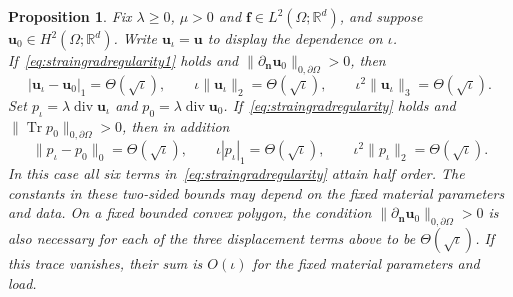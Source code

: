 \documentclass[10pt]{amsart}
\newtheorem{proposition}[theorem]{Proposition}
\renewcommand{\div}{\operatorname{div}}
\numberwithin{equation}{section}
\begin{document}
\begin{proposition}\label{prop:boundary-mismatch}
Fix $\lambda\geq0$, $\mu>0$ and $\boldsymbol f\in L^2(\Omega;\mathbb R^d)$, and suppose $\boldsymbol u_0\in H^2(\Omega;\mathbb R^d)$. Write $\boldsymbol u_\iota=\boldsymbol u$ to display the dependence on $\iota$. If~\eqref{eq:straingradregularity1} holds and $\|\partial_{\boldsymbol n}\boldsymbol u_0\|_{0,\partial\Omega}>0$, then
\[
|\boldsymbol u_\iota-\boldsymbol u_0|_1=\Theta(\sqrt\iota),\qquad
\iota\|\boldsymbol u_\iota\|_2=\Theta(\sqrt\iota),\qquad
\iota^2\|\boldsymbol u_\iota\|_3=\Theta(\sqrt\iota).
\]
Set $p_\iota=\lambda\div\boldsymbol u_\iota$ and $p_0=\lambda\div\boldsymbol u_0$. If~\eqref{eq:straingradregularity} holds and $\|\operatorname{Tr}p_0\|_{0,\partial\Omega}>0$, then in addition
\[
\|p_\iota-p_0\|_0=\Theta(\sqrt\iota),\qquad
\iota|p_\iota|_1=\Theta(\sqrt\iota),\qquad
\iota^2\|p_\iota\|_2=\Theta(\sqrt\iota).
\]
In this case all six terms in~\eqref{eq:straingradregularity} attain half order. The constants in these two-sided bounds may depend on the fixed material parameters and data.
On a fixed bounded convex polygon, the condition $\|\partial_{\boldsymbol n}\boldsymbol u_0\|_{0,\partial\Omega}>0$ is also necessary for each of the three displacement terms above to be $\Theta(\sqrt\iota)$. If this trace vanishes, their sum is $O(\iota)$ for the fixed material parameters and load.
\end{proposition}
\end{document}
